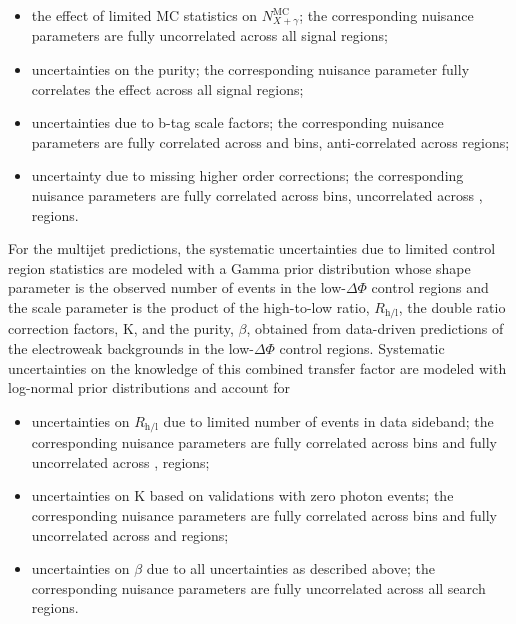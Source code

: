 \begin{itemize}
 \item the effect of limited MC statistics on $N_{X+\gamma}^{\mathrm{MC}}$; the corresponding nuisance parameters are fully uncorrelated across all signal regions;
 \item uncertainties on the purity; the corresponding nuisance parameter fully correlates the effect across all signal regions;
 \item uncertainties due to b-tag scale factors; the corresponding nuisance parameters are fully correlated across \ptmiss and \nj bins, anti-correlated across \nb regions;
 \item uncertainty due to missing higher order corrections; the corresponding nuisance parameters are fully correlated across \ptmiss bins, uncorrelated across \nb, \nj regions.
\end{itemize}


For the multijet predictions, the systematic uncertainties due to limited 
control region statistics are modeled with a 
Gamma prior distribution whose shape parameter is the observed number
of events in the low-$\Delta\Phi$ control regions and the scale parameter
is the product of the high-to-low ratio, $R_{\mathrm{h/l}}$, the double ratio
correction factors, K, and the purity, $\beta$, obtained from data-driven predictions
of the electroweak backgrounds in the low-$\Delta\Phi$ control regions. 
Systematic uncertainties on the knowledge of this combined transfer factor are 
modeled with log-normal prior distributions and account for

\begin{itemize}
 \item uncertainties on $R_{\mathrm{h/l}}$ due to limited number of events in data sideband; the corresponding nuisance parameters 
 are fully correlated across \ptmiss bins and fully uncorrelated across \nb, \nj regions;
 \item uncertainties on K based on validations with zero photon events; the corresponding nuisance parameters are fully 
   correlated across \ptmiss bins and fully uncorrelated across \nb and \nj regions;
 \item uncertainties on $\beta$ due to all uncertainties as described above; the corresponding nuisance parameters are 
  fully uncorrelated across all search regions.
\end{itemize} 

